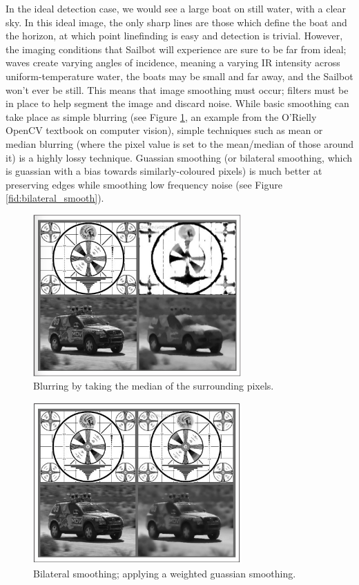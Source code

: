 In the ideal detection case, we would see a large boat on still water, with a clear sky. In this ideal image, the only sharp lines are those which define the boat and the horizon, at which point linefinding is easy and detection is trivial. However, the imaging conditions that Sailbot will experience are sure to be far from ideal; waves create varying angles of incidence, meaning a varying IR intensity across uniform-temperature water, the boats may be small and far away, and the Sailbot won't ever be still. This means that image smoothing must occur; filters must be in place to help segment the image and discard noise. While basic smoothing can take place as simple blurring (see Figure \ref{fig:median_blur}, an example from the O'Rielly OpenCV textbook on computer vision), simple techniques such as mean or median blurring (where the pixel value is set to the mean/median of those around it) is a highly lossy technique. Guassian smoothing (or bilateral smoothing, which is guassian with a bias towards similarly-coloured pixels) is much better at preserving edges while smoothing low frequency noise (see Figure \ref{fid:bilateral_smooth}).

\begin{figure}
\centering
\includegraphics[width=80mm,natwidth=300,natheight=300]{"./image/median_blurring"}
\caption{Blurring by taking the median of the surrounding pixels.}
\label{fig:median_blur}
\end{figure}

\begin{figure}
\centering
\includegraphics[width=80mm,natwidth=300,natheight=300]{"./image/bilateral_smoothing"}
\caption{Bilateral smoothing; applying a weighted guassian smoothing.}
\label{fig:bilateral_smooth}
\end{figure}


